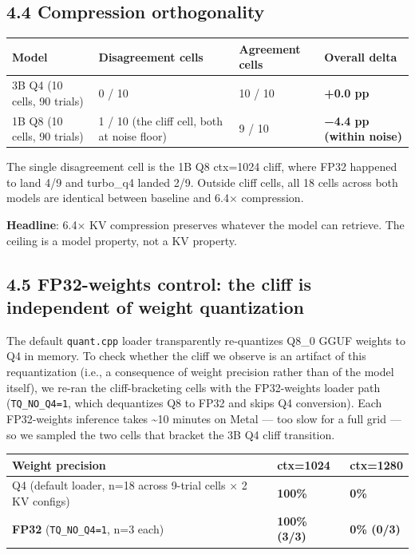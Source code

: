 \documentclass[11pt]{article}
\begin{document}
\subsection*{4.4 Compression orthogonality}


\begin{center}
\begin{tabular}{llll}
\toprule
Model & Disagreement cells & Agreement cells & Overall delta \\
\midrule
3B Q4 (10 cells, 90 trials) & 0 / 10 & 10 / 10 & \textbf{+0.0 pp} \\
1B Q8 (10 cells, 90 trials) & 1 / 10 (the cliff cell, both at noise floor) & 9 / 10 & \textbf{−4.4 pp (within noise)} \\
\bottomrule
\end{tabular}
\end{center}


The single disagreement cell is the 1B Q8 ctx=1024 cliff, where FP32 happened to land 4/9 and turbo\_q4 landed 2/9. Outside cliff cells, all 18 cells across both models are identical between baseline and 6.4× compression.


\textbf{Headline}: 6.4× KV compression preserves whatever the model can retrieve. The ceiling is a model property, not a KV property.


\subsection*{4.5 FP32-weights control: the cliff is independent of weight quantization}


The default \texttt{quant.cpp} loader transparently re-quantizes Q8\_0 GGUF weights to Q4 in memory. To check whether the cliff we observe is an artifact of this requantization (i.e., a consequence of weight precision rather than of the model itself), we re-ran the cliff-bracketing cells with the FP32-weights loader path (\texttt{TQ\_NO\_Q4=1}, which dequantizes Q8 to FP32 and skips Q4 conversion). Each FP32-weights inference takes \textasciitilde{}10 minutes on Metal — too slow for a full grid — so we sampled the two cells that bracket the 3B Q4 cliff transition.


\begin{center}
\begin{tabular}{lll}
\toprule
Weight precision & ctx=1024 & ctx=1280 \\
\midrule
Q4 (default loader, n=18 across 9-trial cells × 2 KV configs) & \textbf{100\%} & \textbf{0\%} \\
\textbf{FP32} (\texttt{TQ\_NO\_Q4=1}, n=3 each) & \textbf{100\% (3/3)} & \textbf{0\% (0/3)} \\
\bottomrule
\end{tabular}
\end{center}
\end{document}
